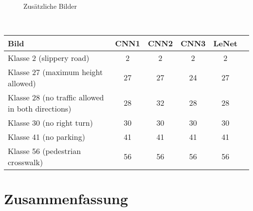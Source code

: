 \begin{figure} [!ht]
	\centering
	\\
	\caption{Zusätzliche Bilder} \label{pic:new-pics}
\end{figure} \ \\
%
\begin{table}[ht]
	\begin{tabular}{|l|cccc|c|}
		\hline
		Bild & CNN1 & CNN2 & CNN3 & LeNet\\\hline
		Klasse 2  (slippery road) & 2 & 2 & 2 & 2\\
		Klasse 27 (maximum height allowed) & 27 & 27 & 24 & 27\\
		Klasse 28 (no traffic allowed in both directions) & 28 & 32 & 28 & 28\\
		Klasse 30 (no right turn) & 30 & 30 & 30 & 30\\
		Klasse 41 (no parking) & 41 & 41 & 41 & 41\\
		Klasse 56 (pedestrian crosswalk) & 56 & 56 & 56 & 56\\
		\hline
	\end{tabular}
\end{table}
\section{Zusammenfassung}

